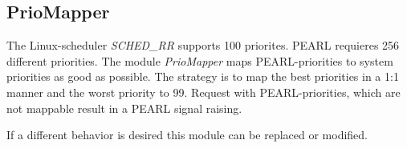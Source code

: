 \subsection{PrioMapper}
The Linux-scheduler {\em SCHED\_RR} supports 100 priorites. PEARL requieres 
256 different priorities.
The module {\em PrioMapper} maps PEARL-priorities to system priorities as good
as possible. The strategy is to map the best priorities in a 1:1 manner and the
worst priority to 99. 
Request with PEARL-priorities, which are not mappable result in a PEARL
signal raising.

If a different behavior is desired this module can be replaced or modified.


